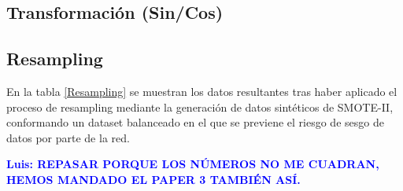 \documentclass{uathesis-es}
\begin{document}
\subsection{Transformación (Sin/Cos)}


\subsection{Resampling}

En la tabla \ref{Resampling} se muestran los datos resultantes tras haber aplicado el proceso de resampling mediante la generación de datos sintéticos de SMOTE-II, conformando un dataset balanceado en el que se previene el riesgo de sesgo de datos por parte de la red.


\textcolor{blue}{\textbf{Luis: REPASAR PORQUE LOS NÚMEROS NO ME CUADRAN, HEMOS MANDADO EL PAPER 3 TAMBIÉN ASÍ.}}\\
\end{document}

